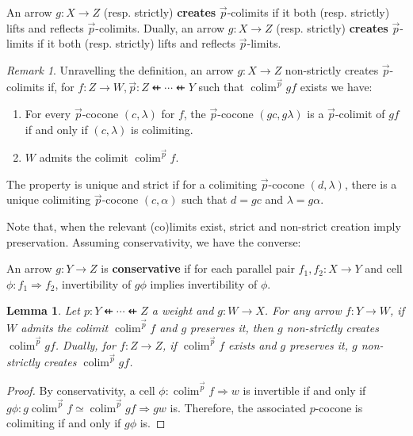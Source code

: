 \documentclass[10pt,a4paper]{article}
\newcommand{\To}{\Rightarrow}
\newcommand{\dfrom}{\nvleftarrow}
\DeclareMathOperator{\colim}{colim}
\theoremstyle{plain}
\newtheorem{lemma}[theorem]{Lemma}
\theoremstyle{definition}
\theoremstyle{remark}
\newtheorem{remark}[theorem]{Remark}
\begin{document}
\begin{definition}
    An arrow $g : X \to Z$ (resp. strictly) \textbf{creates} $\vec p$-colimits if it both (resp. strictly) lifts and reflects $\vec p$-colimits. Dually, an arrow $g : X \to Z$ (resp. strictly) \textbf{creates} $\vec p$-limits if it both (resp. strictly) lifts and reflects $\vec p$-limits.
\end{definition}

\begin{remark}
    \label{rem:co_lim_creation}
    Unravelling the definition, an arrow $g : X \to Z$ non-strictly creates $\vec p$-colimits if, for $f : Z \to W, \vec p : Z \dfrom \cdots \dfrom Y$ such that $\colim^{\vec p}gf$ exists we have:
    \begin{enumerate}
        \item For every $\vec p$-cocone $(c, \lambda)$ for $f$, the $\vec p$-cocone $(gc, g\lambda)$ is a $\vec p$-colimit of $gf$ if and only if $(c, \lambda)$ is colimiting.
        \item $W$ admits the colimit $\colim^{\vec p}f$.
    \end{enumerate}
    The property is unique and strict if for a colimiting $\vec p$-cocone $(d, \lambda)$, there is a unique colimiting $\vec p$-cocone $(c, \alpha)$ such that $d = gc$ and $\lambda = g\alpha$.
\end{remark}

Note that, when the relevant (co)limits exist, strict and non-strict creation imply preservation. Assuming conservativity, we have the converse:

\begin{definition}
    An arrow $g : Y \to Z$ is \textbf{conservative} if for each parallel pair $f_1, f_2 : X \to Y$ and cell $\phi : f_1 \To f_2$, invertibility of $g\phi$ implies invertibility of $\phi$.
\end{definition}

\begin{lemma}
    \label{lem:cons_create}
    Let $p : Y \dfrom \cdots \dfrom Z$ a weight and $g : W \to X$. For any arrow $f : Y \to W$, if $W$ admits the colimit $\colim^{\vec p}f$ and $g$ preserves it, then $g$ non-strictly creates $\colim^{\vec p}gf$. Dually, for $f : Z \to Z$, if $\colim^{\vec p}f$ exists and $g$ preserves it, $g$ non-strictly creates $\colim^{\vec p}gf$.
\end{lemma}

\begin{proof}
    By conservativity, a cell $\phi : \colim^{\vec p}f \To w$ is invertible if and only if $g\phi : g\colim^{\vec p}f \simeq \colim^{\vec p}gf \To gw$ is. Therefore, the associated $p$-cocone is colimiting if and only if $g\phi$ is.
\end{proof}
\end{document}
